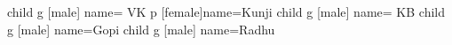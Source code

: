 \documentclass{article}
\begin{document}
\begin{landscape}
\begin{genealogypicture}
{{{{			}
		}
		child {
			g [male] {name={ VK }}
			p [female]{name={Kunji}}
			child {
				g [male] {name={ KB }}
			}
			child {
				g [male] {name={Gopi}}
			}
			child {
				g [male] {name={Radhu}}
			}
		}
	}
}

\end{genealogypicture}

\end{landscape}
\end{document}
